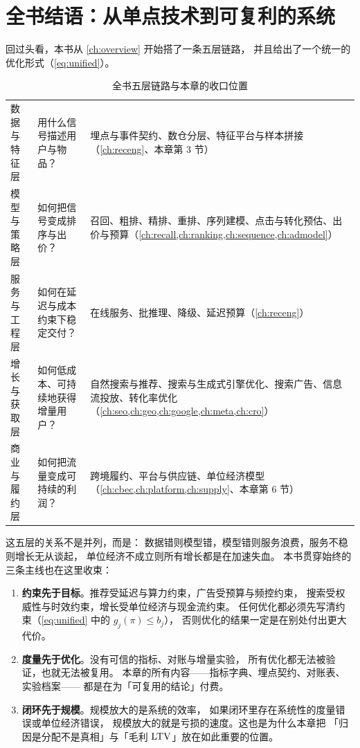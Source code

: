 \section{全书结语：从单点技术到可复利的系统}

回过头看，本书从 \cref{ch:overview} 开始搭了一条五层链路，
并且给出了一个统一的优化形式（\cref{eq:unified}）。

\begin{table}[htbp]
\centering
\caption{全书五层链路与本章的收口位置}
\label{tab:growth-bookmap}
\small
\begin{tabularx}{\textwidth}{L{2.6cm} L{3.3cm} Y}
\toprule
{} &  &  \\
\midrule
数据与特征层 & 用什么信号描述用户与物品？ & 埋点与事件契约、数仓分层、特征平台与样本拼接（\cref{ch:receng}、本章第 3 节） \\
\addlinespace
模型与策略层 & 如何把信号变成排序与出价？ & 召回、粗排、精排、重排、序列建模、点击与转化预估、出价与预算（\cref{ch:recall,ch:ranking,ch:sequence,ch:admodel}） \\
\addlinespace
服务与工程层 & 如何在延迟与成本约束下稳定交付？ & 在线服务、批推理、降级、延迟预算（\cref{ch:receng}） \\
\addlinespace
增长与获取层 & 如何低成本、可持续地获得增量用户？ & 自然搜索与推荐、搜索与生成式引擎优化、搜索广告、信息流投放、转化率优化（\cref{ch:seo,ch:geo,ch:google,ch:meta,ch:cro}） \\
\addlinespace
商业与履约层 & 如何把流量变成可持续的利润？ & 跨境履约、平台与供应链、单位经济模型（\cref{ch:cbec,ch:platform,ch:supply}、本章第 6 节） \\
\bottomrule
\end{tabularx}
\end{table}

这五层的关系不是并列，而是：
数据错则模型错，模型错则服务浪费，服务不稳则增长无从谈起，
单位经济不成立则所有增长都是在加速失血。
本书贯穿始终的三条主线也在这里收束：

\begin{enumerate}
  \item \textbf{约束先于目标}。推荐受延迟与算力约束，广告受预算与频控约束，
        搜索受权威性与时效约束，增长受单位经济与现金流约束。
        任何优化都必须先写清约束（\cref{eq:unified} 中的 $g_j(\pi) \le b_j$），
        否则优化的结果一定是在别处付出更大代价。
  \item \textbf{度量先于优化}。没有可信的指标、对账与增量实验，
        所有优化都无法被验证，也就无法被复用。
        本章的所有内容——指标字典、埋点契约、对账表、实验档案——
        都是在为「可复用的结论」付费。
  \item \textbf{闭环先于规模}。规模放大的是系统的效率，
        如果闭环里存在系统性的度量错误或单位经济错误，
        规模放大的就是亏损的速度。这也是为什么本章把
        「归因是分配不是真相」与「毛利 $\operatorname{LTV}$」放在如此重要的位置。
\end{enumerate}

